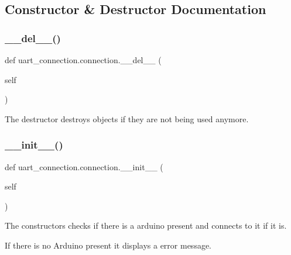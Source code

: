 \subsection{Constructor \& Destructor Documentation}
\mbox{\label{classuart__connection_1_1connection_a024c5810ba0f705458acbcaa150cd357}} 
\subsubsection{\texorpdfstring{\+\_\+\+\_\+del\+\_\+\+\_\+()}{\_\_del\_\_()}}
{\footnotesize\ttfamily def uart\+\_\+connection.\+connection.\+\_\+\+\_\+del\+\_\+\+\_\+ (\begin{DoxyParamCaption}\item[{}]{self }\end{DoxyParamCaption})}



The destructor destroys objects if they are not being used anymore. 

\mbox{\label{classuart__connection_1_1connection_aef00ac36fbfc67bfff3276c0cd2e6301}} 
\subsubsection{\texorpdfstring{\+\_\+\+\_\+init\+\_\+\+\_\+()}{\_\_init\_\_()}}
{\footnotesize\ttfamily def uart\+\_\+connection.\+connection.\+\_\+\+\_\+init\+\_\+\+\_\+ (\begin{DoxyParamCaption}\item[{}]{self }\end{DoxyParamCaption})}



The constructors checks if there is a arduino present and connects to it if it is. 

If there is no Arduino present it displays a error message. 


